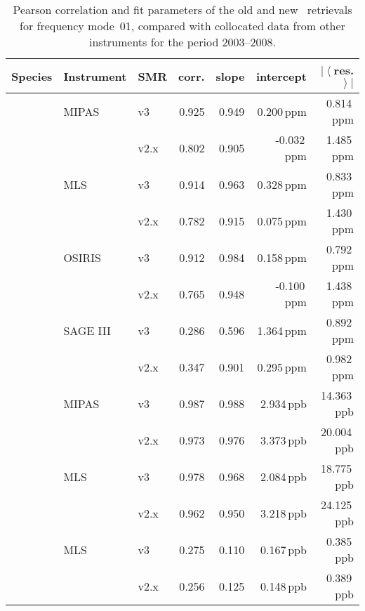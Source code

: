 \begin{table}[tbhp]
\centering
\caption{Pearson correlation and fit parameters of the old and new \smr\
retrievals for frequency mode~01, compared with collocated data from other
instruments for the period 2003--2008.
}
\label{tab:fm01:stats}
\begin{tabular}{lllrrrr}
    \toprule
    \textbf{Species} & \textbf{Instrument} & \textbf{SMR} & \textbf{corr.} & \textbf{slope} & \textbf{intercept} & \textbf{$\left|\left<\right.\right.$res.$\left.\left.\right>\right|$} \\
    \midrule
    \chem{O3}   & MIPAS     & v3    & 0.925 & 0.949 & 0.200\,ppm    &  0.814\,ppm \\
                &           & v2.x  & 0.802 & 0.905 & -0.032\,ppm   &  1.485\,ppm \\
    \cline{2-7}
                & MLS       & v3    & 0.914 & 0.963 & 0.328\,ppm    &  0.833\,ppm \\
                &           & v2.x  & 0.782 & 0.915 & 0.075\,ppm    &  1.430\,ppm \\
    \cline{2-7}
                & OSIRIS    & v3    & 0.912 & 0.984 & 0.158\,ppm    &  0.792\,ppm \\
                &           & v2.x  & 0.765 & 0.948 & -0.100\,ppm   &  1.438\,ppm \\
    \cline{2-7}
                & SAGE III  & v3    & 0.286 & 0.596 & 1.364\,ppm    &  0.892\,ppm \\
                &           & v2.x  & 0.347 & 0.901 & 0.295\,ppm    &  0.982\,ppm \\
    \midrule
    \chem{N_2O} & MIPAS     & v3    & 0.987 & 0.988 & 2.934\,ppb    & 14.363\,ppb \\
                &           & v2.x  & 0.973 & 0.976 & 3.373\,ppb    & 20.004\,ppb \\
    \cline{2-7}
                & MLS       & v3    & 0.978 & 0.968 & 2.084\,ppb    & 18.775\,ppb \\
                &           & v2.x  & 0.962 & 0.950 & 3.218\,ppb    & 24.125\,ppb \\
    \midrule
    \chem{ClO}  & MLS       & v3    & 0.275 & 0.110 & 0.167\,ppb    &  0.385\,ppb \\
                &           & v2.x  & 0.256 & 0.125 & 0.148\,ppb    &  0.389\,ppb \\
    \bottomrule
\end{tabular}
\end{table}

